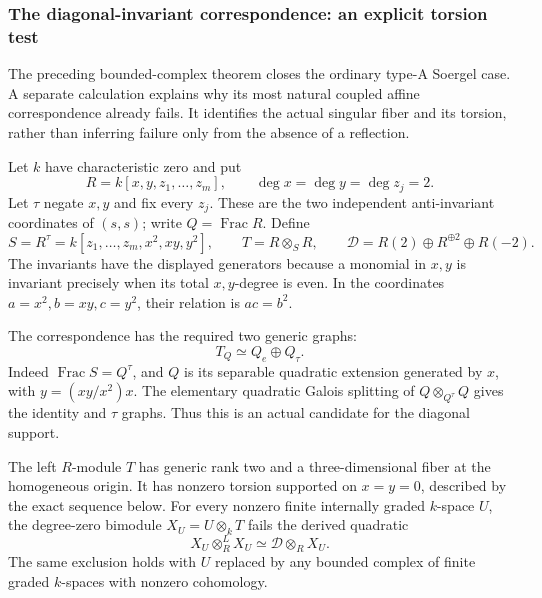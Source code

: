 \subsubsection{The diagonal-invariant correspondence: an explicit torsion test}

The preceding bounded-complex theorem closes the ordinary type-A
Soergel case. A separate calculation explains why its most natural
coupled affine correspondence already fails. It identifies the
actual singular fiber and its torsion, rather than inferring failure
only from the absence of a reflection.

Let \(k\) have characteristic zero and put
\[
 R=k[x,y,z_1,\ldots,z_m],\qquad \deg x=\deg y=\deg z_j=2.
\]
Let \(\tau\) negate \(x,y\) and fix every \(z_j\). These are the two
independent anti-invariant coordinates of \((s,s)\); write
\(Q=\operatorname{Frac}R\). Define
\begin{equation}\label{eq:diagonalinvariantcandidate}
 S=R^\tau=k[z_1,\ldots,z_m,x^2,xy,y^2],
 \qquad T=R\otimes_S R,
 \qquad \mathscr D=R(2)\oplus R^{\oplus2}\oplus R(-2).
\end{equation}
The invariants have the displayed generators because a monomial
in \(x,y\) is invariant precisely when its total \(x,y\)-degree is
even. In the coordinates \(a=x^2,b=xy,c=y^2\), their relation is
\(ac=b^2\).

The correspondence has the required two generic graphs:
\[
                    T_Q\simeq Q_e\oplus Q_\tau.
\]
Indeed \(\operatorname{Frac}S=Q^\tau\), and \(Q\) is its separable
quadratic extension generated by \(x\), with
\(y=(xy/x^2)x\). The elementary quadratic Galois splitting of
\(Q\otimes_{Q^\tau}Q\) gives the identity and \(\tau\) graphs.
Thus this is an actual candidate for the diagonal support.

\begin{finding}
\label{f:invariantcorrespondencetest}
The left \(R\)-module \(T\) has generic rank two and a
three-dimensional fiber at the homogeneous origin. It has
nonzero torsion supported on \(x=y=0\), described by the exact
sequence below. For every nonzero finite internally graded
\(k\)-space \(U\), the degree-zero bimodule
\(X_U=U\otimes_kT\) fails the derived quadratic
\begin{equation}\label{eq:invariantderivedquadratic}
 X_U\otimes_R^L X_U\simeq\mathscr D\otimes_R X_U.
\end{equation}
The same exclusion holds with \(U\) replaced by any bounded
complex of finite graded \(k\)-spaces with nonzero cohomology.
\end{finding}

